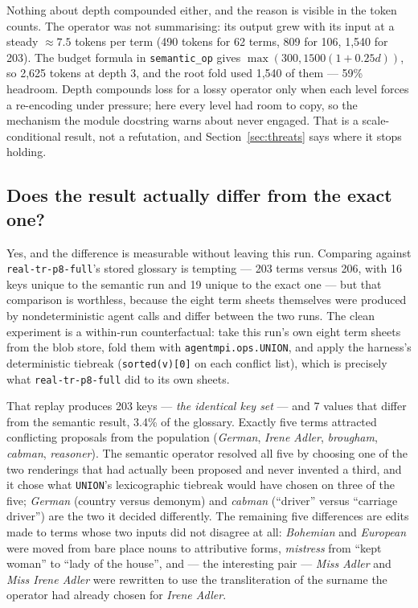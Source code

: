 \documentclass[11pt]{article}
\begin{document}
Nothing about depth compounded either, and the reason is visible in the token counts. The
operator was not summarising: its output grew with its input at a steady $\approx7.5$ tokens per
term (490 tokens for 62 terms, 809 for 106, 1{,}540 for 203). The budget formula in
\texttt{semantic\_op} gives $\max(300, 1500(1+0.25d))$, so 2{,}625 tokens at depth 3, and the
root fold used 1{,}540 of them --- 59\% headroom. Depth compounds loss for a lossy operator only
when each level forces a re-encoding under pressure; here every level had room to copy, so the
mechanism the module docstring warns about never engaged. That is a scale-conditional result,
not a refutation, and Section~\ref{sec:threats} says where it stops holding.

\subsection{Does the result actually differ from the exact one?}

Yes, and the difference is measurable without leaving this run. Comparing against
\texttt{real-tr-p8-full}'s stored glossary is tempting --- 203 terms versus 206, with 16 keys
unique to the semantic run and 19 unique to the exact one --- but that comparison is worthless,
because the eight term sheets themselves were produced by nondeterministic agent calls and
differ between the two runs. The clean experiment is a within-run counterfactual: take this
run's own eight term sheets from the blob store, fold them with \texttt{agentmpi.ops.UNION}, and
apply the harness's deterministic tiebreak (\texttt{sorted(v)[0]} on each conflict list), which
is precisely what \texttt{real-tr-p8-full} did to its own sheets.

That replay produces 203 keys --- \emph{the identical key set} --- and 7 values that differ from
the semantic result, 3.4\% of the glossary. Exactly five terms attracted conflicting proposals
from the population (\emph{German}, \emph{Irene Adler}, \emph{brougham}, \emph{cabman},
\emph{reasoner}). The semantic operator resolved all five by choosing one of the two renderings
that had actually been proposed and never invented a third, and it chose what \texttt{UNION}'s
lexicographic tiebreak would have chosen on three of the five; \emph{German} (country versus
demonym) and \emph{cabman} (``driver'' versus ``carriage driver'') are the two it decided
differently. The remaining five differences are edits made to terms whose two inputs did not
disagree at all: \emph{Bohemian} and \emph{European} were moved from bare place nouns to
attributive forms, \emph{mistress} from ``kept woman'' to ``lady of the house'', and ---
the interesting pair --- \emph{Miss Adler} and \emph{Miss Irene Adler} were rewritten to use the
transliteration of the surname the operator had already chosen for \emph{Irene Adler}.
\end{document}
